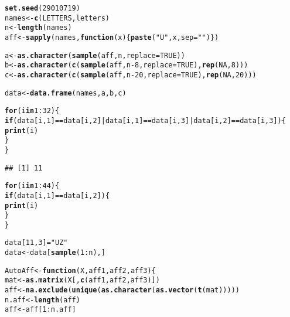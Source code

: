 \documentclass{article}\usepackage[]{graphicx}\usepackage[]{color}
\makeatletter
\newcommand{\hlnum}[1]{\textcolor[rgb]{0.686,0.059,0.569}{#1}}%
\newcommand{\hlstr}[1]{\textcolor[rgb]{0.192,0.494,0.8}{#1}}%
\newcommand{\hlopt}[1]{\textcolor[rgb]{0,0,0}{#1}}%
\newcommand{\hlstd}[1]{\textcolor[rgb]{0.345,0.345,0.345}{#1}}%
\newcommand{\hlkwa}[1]{\textcolor[rgb]{0.161,0.373,0.58}{\textbf{#1}}}%
\newcommand{\hlkwb}[1]{\textcolor[rgb]{0.69,0.353,0.396}{#1}}%
\newcommand{\hlkwc}[1]{\textcolor[rgb]{0.333,0.667,0.333}{#1}}%
\newcommand{\hlkwd}[1]{\textcolor[rgb]{0.737,0.353,0.396}{\textbf{#1}}}%
\newenvironment{kframe}{%
 \def\at@end@of@kframe{}%
 \ifinner\ifhmode%
  \def\at@end@of@kframe{\end{minipage}}%
  \begin{minipage}{\columnwidth}%
 \fi\fi%
 \def\FrameCommand##1{\hskip\@totalleftmargin \hskip-\fboxsep
 \colorbox{shadecolor}{##1}\hskip-\fboxsep
     \hskip-\linewidth \hskip-\@totalleftmargin \hskip\columnwidth}%
 \MakeFramed {\advance\hsize-\width
   \@totalleftmargin\z@ \linewidth\hsize
   \@setminipage}}%
 {\par\unskip\endMakeFramed%
 \at@end@of@kframe}
\newenvironment{knitrout}{}{} %
\makeatother
\begin{document}
\begin{knitrout}
\color{fgcolor}\begin{kframe}
\begin{alltt}
\hlkwd{set.seed}\hlstd{(}\hlnum{29010719}\hlstd{)}
\hlstd{names} \hlkwb{<-} \hlkwd{c}\hlstd{(LETTERS, letters)}
\hlstd{n} \hlkwb{<-} \hlkwd{length}\hlstd{(names)}
\hlstd{aff} \hlkwb{<-} \hlkwd{sapply}\hlstd{(names,} \hlkwa{function}\hlstd{(}\hlkwc{x}\hlstd{)\{}\hlkwd{paste}\hlstd{(}\hlstr{"U"}\hlstd{, x,} \hlkwc{sep} \hlstd{=} \hlstr{""}\hlstd{)\})}

\hlstd{a} \hlkwb{<-} \hlkwd{as.character}\hlstd{(}\hlkwd{sample}\hlstd{(aff, n,} \hlkwc{replace} \hlstd{=} \hlnum{TRUE}\hlstd{))}
\hlstd{b} \hlkwb{<-} \hlkwd{as.character}\hlstd{(}\hlkwd{c}\hlstd{(}\hlkwd{sample}\hlstd{(aff, n} \hlopt{-} \hlnum{8}\hlstd{,} \hlkwc{replace} \hlstd{=} \hlnum{TRUE}\hlstd{),} \hlkwd{rep}\hlstd{(}\hlnum{NA}\hlstd{,} \hlnum{8}\hlstd{)))}
\hlstd{c} \hlkwb{<-} \hlkwd{as.character}\hlstd{(}\hlkwd{c}\hlstd{(}\hlkwd{sample}\hlstd{(aff, n} \hlopt{-} \hlnum{20}\hlstd{,} \hlkwc{replace} \hlstd{=} \hlnum{TRUE}\hlstd{),} \hlkwd{rep}\hlstd{(}\hlnum{NA}\hlstd{,} \hlnum{20}\hlstd{)))}

\hlstd{data} \hlkwb{<-} \hlkwd{data.frame}\hlstd{(names, a, b, c)}


\hlkwa{for} \hlstd{(i} \hlkwa{in} \hlnum{1}\hlopt{:}\hlnum{32}\hlstd{) \{}
  \hlkwa{if} \hlstd{(data[i,}\hlnum{1}\hlstd{]} \hlopt{==} \hlstd{data[i,}\hlnum{2}\hlstd{]} \hlopt{|} \hlstd{data[i,}\hlnum{1}\hlstd{]} \hlopt{==} \hlstd{data[i,}\hlnum{3}\hlstd{]} \hlopt{|} \hlstd{data[i,}\hlnum{2}\hlstd{]} \hlopt{==} \hlstd{data[i,}\hlnum{3}\hlstd{]) \{}
    \hlkwd{print}\hlstd{(i)}
  \hlstd{\}}
\hlstd{\}}
\end{alltt}
\begin{verbatim}
## [1] 11
\end{verbatim}
\begin{alltt}
\hlkwa{for} \hlstd{(i} \hlkwa{in} \hlnum{1}\hlopt{:}\hlnum{44}\hlstd{) \{}
  \hlkwa{if} \hlstd{(data[i,}\hlnum{1}\hlstd{]} \hlopt{==} \hlstd{data[i,}\hlnum{2}\hlstd{]) \{}
    \hlkwd{print}\hlstd{(i)}
  \hlstd{\}}
\hlstd{\}}

\hlstd{data[}\hlnum{11}\hlstd{,} \hlnum{3}\hlstd{]} \hlkwb{=} \hlstr{"UZ"}
\hlstd{data} \hlkwb{<-} \hlstd{data[}\hlkwd{sample}\hlstd{(}\hlnum{1}\hlopt{:}\hlstd{n), ]}

\hlstd{AutoAff} \hlkwb{<-} \hlkwa{function}\hlstd{(}\hlkwc{X}\hlstd{,} \hlkwc{aff1}\hlstd{,} \hlkwc{aff2}\hlstd{,} \hlkwc{aff3}\hlstd{) \{}
  \hlstd{mat} \hlkwb{<-} \hlkwd{as.matrix}\hlstd{(X[,} \hlkwd{c}\hlstd{(aff1, aff2, aff3)])}
  \hlstd{aff} \hlkwb{<-} \hlkwd{na.exclude}\hlstd{(}\hlkwd{unique}\hlstd{(}\hlkwd{as.character}\hlstd{(}\hlkwd{as.vector}\hlstd{(}\hlkwd{t}\hlstd{(mat)))))}
  \hlstd{n.aff} \hlkwb{<-} \hlkwd{length}\hlstd{(aff)}
  \hlstd{aff} \hlkwb{<-} \hlstd{aff[}\hlnum{1}\hlopt{:}\hlstd{n.aff]}


\end{alltt}
\end{kframe}
\end{knitrout}
\end{document}

